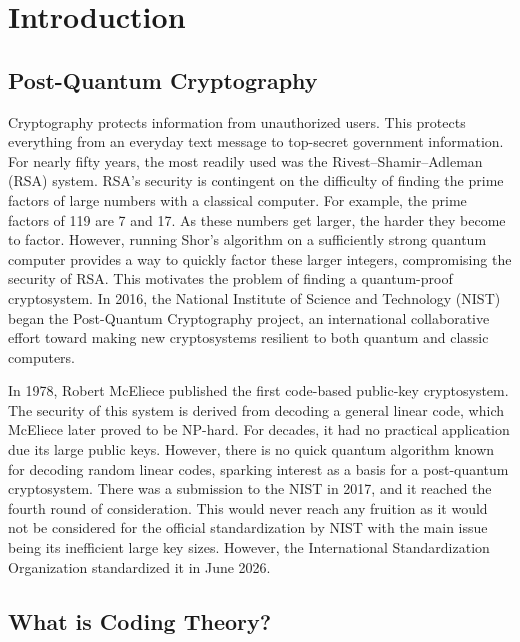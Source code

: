 
\chapter{Introduction} \label{chapter1:introduction}

\section{Post-Quantum Cryptography}

Cryptography protects information from unauthorized users. This protects everything from an everyday text message to top-secret government information. For nearly fifty years, the most readily used was the Rivest–Shamir–Adleman (RSA) system. RSA’s security is contingent on the difficulty of finding the prime factors of large numbers with a classical computer. For example, the prime factors of 119 are 7 and 17. As these numbers get larger, the harder they become to factor. However, running Shor’s algorithm on a sufficiently strong quantum computer provides a way to quickly factor these larger integers, compromising the security of RSA. This motivates the problem of finding a quantum-proof cryptosystem. In 2016, the National Institute of Science and Technology (NIST) began the Post-Quantum Cryptography project, an international collaborative effort toward making new cryptosystems resilient to both quantum and classic computers. 

In 1978, Robert McEliece published the first code-based public-key cryptosystem. The security of this system is derived from decoding a general linear code, which McEliece later proved to be NP-hard. For decades, it had no practical application due its large public keys. However, there is no quick quantum algorithm known for decoding random linear codes, sparking interest as a basis for a post-quantum cryptosystem. There was a submission to the NIST in 2017, and it reached the fourth round of consideration. This would never reach any fruition as it would not be considered for the official standardization by NIST with the main issue being its inefficient large key sizes. However, the International Standardization Organization standardized it in June 2026. 

\section {What is Coding Theory?}

